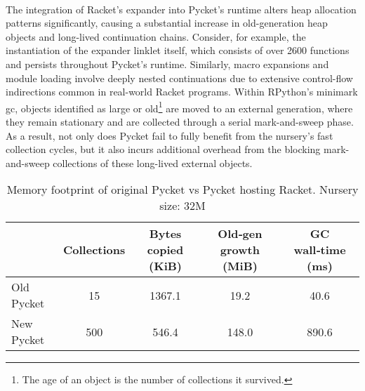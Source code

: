 		\paragraph{}%
			The integration of Racket's expander into Pycket's runtime alters heap allocation patterns significantly, causing a substantial increase in old-generation heap objects and long-lived continuation chains. Consider, for example, the instantiation of the expander linklet itself, which consists of over 2600 functions and persists throughout Pycket's runtime. Similarly, macro expansions and module loading involve deeply nested continuations due to extensive control-flow indirections common in real-world Racket programs. Within RPython's minimark \gls{gc}, objects identified as large or old\footnote{The age of an object is the number of
			collections it survived.} are moved to an external generation, where they remain stationary and are collected through a serial mark-and-sweep phase. As a result, not only does Pycket fail to fully benefit from the nursery's fast collection cycles, but it also incurs additional overhead from the blocking mark-and-sweep collections of these long-lived external objects.

		\vspace{1.5em}

		\begin{table}[!h]
			\centering
			\small
			\begin{tabular}{lcccc}
			\toprule
			& Collections & Bytes copied (KiB) & Old‑gen growth (MiB) & GC wall‑time (ms)\\
			\midrule
			Old Pycket             	& 15   & 1367.1 & 19.2  & 40.6\\
			New Pycket 				& 500  &   546.4 & 148.0 & 890.6\\
			\bottomrule
			\end{tabular}
			\caption{Memory footprint of original Pycket vs Pycket hosting Racket. Nursery size: 32M}
			\label{table:memory-footprints}
		\end{table}

